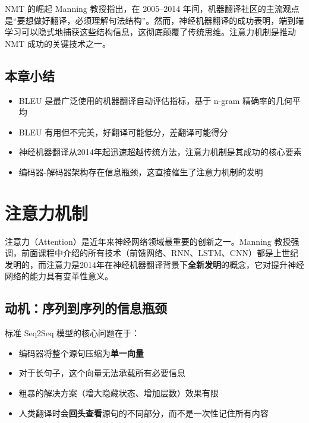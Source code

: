 \documentclass[a4paper]{article}
\begin{document}
\begin{knowledgebox}{NMT 的崛起}
Manning 教授指出，在 2005--2014 年间，机器翻译社区的主流观点是``要想做好翻译，必须理解句法结构''。然而，神经机器翻译的成功表明，端到端学习可以隐式地捕获这些结构信息，这彻底颠覆了传统思维。注意力机制是推动 NMT 成功的关键技术之一。
\end{knowledgebox}

\subsection{本章小结}

\begin{itemize}
    \item BLEU 是最广泛使用的机器翻译自动评估指标，基于 n-gram 精确率的几何平均
    \item BLEU 有用但不完美，好翻译可能低分，差翻译可能得分
    \item 神经机器翻译从2014年起迅速超越传统方法，注意力机制是其成功的核心要素
    \item 编码器-解码器架构存在信息瓶颈，这直接催生了注意力机制的发明
\end{itemize}


\section{注意力机制}

注意力（Attention）是近年来神经网络领域最重要的创新之一。Manning 教授强调，前面课程中介绍的所有技术（前馈网络、RNN、LSTM、CNN）都是上世纪发明的，而注意力是2014年在神经机器翻译背景下\textbf{全新发明}的概念，它对提升神经网络的能力具有变革性意义。

\subsection{动机：序列到序列的信息瓶颈}









标准 Seq2Seq 模型的核心问题在于：

\begin{itemize}
    \item 编码器将整个源句压缩为\textbf{单一向量}
    \item 对于长句子，这个向量无法承载所有必要信息
    \item 粗暴的解决方案（增大隐藏状态、增加层数）效果有限
    \item 人类翻译时会\textbf{回头查看}源句的不同部分，而不是一次性记住所有内容
\end{itemize}
\end{document}
